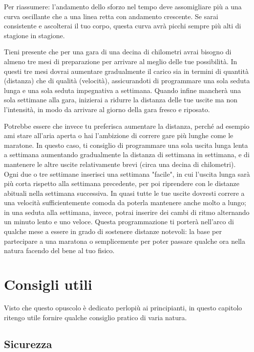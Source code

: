Per riassumere:
l'andamento dello sforzo nel tempo deve assomigliare più a una curva
oscillante che a una linea retta con andamento crescente.
Se sarai consistente e ascolterai il tuo corpo, questa curva
avrà picchi sempre più alti di stagione in stagione.

Tieni presente che per una gara di una decina di chilometri avrai bisogno
di almeno tre mesi di preparazione per arrivare al meglio delle tue possibilità.
In questi tre mesi dovrai aumentare gradualmente il carico
sia in termini di quantità (distanza) che di qualità (velocità),
assicurandoti di programmare una sola seduta lunga
e una sola seduta impegnativa a settimana.
Quando infine mancherà una sola settimane alla gara,
inizierai a ridurre la distanza delle tue
uscite ma non l'intensità, in modo da arrivare al giorno della gara fresco
e riposato.

Potrebbe essere che invece tu preferisca aumentare la distanza,
perché ad esempio ami stare all'aria aperta
o hai l'ambizione di correre gare più lunghe come le maratone.
In questo caso, ti consiglio di programmare una sola uscita lunga lenta a settimana
aumentando gradualmente la distanza di settimana in settimana,
e di mantenere le altre uscite relativamente brevi (circa una decina di chilometri).
Ogni due o tre settimane inserisci una settimana "facile", in cui l'uscita
lunga sarà più corta rispetto alla settimana precedente,
per poi riprendere con le distanze abituali nella settimana successiva.
In quasi tutte le tue uscite dovresti correre a una velocità sufficientemente comoda
da poterla mantenere anche molto a lungo;
in una seduta alla settimana, invece, potrai inserire dei cambi di ritmo
alternando un minuto lento e uno veloce.
Questa programmazione ti porterà nell'arco di qualche mese a essere in grado
di sostenere distanze notevoli: la base per partecipare a una maratona
o semplicemente per poter passare qualche ora nella natura facendo del bene
al tuo fisico.


\chapter{Consigli utili}

Visto che questo opuscolo è dedicato perlopiù ai principianti,
in questo capitolo ritengo utile fornire qualche consiglio
pratico di varia natura.

\section{Sicurezza}

